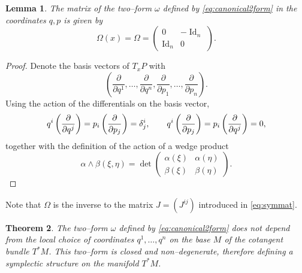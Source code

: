 \documentclass[english,fontsize=11pt,paper=a5,oneside]{scrbook}
\let\d\relax
\DeclareMathOperator{\d}{d}
\DeclareMathOperator{\Id}{Id}
\newtheorem{theorem}{Theorem}[chapter]
\newtheorem{lemma}[theorem]{Lemma}
\theoremstyle{definition}
\begin{document}
\begin{lemma}
    The matrix of the two--form $\omega$ defined by \eqref{eq:canonical2form} in the coordinates $q,p$ is given by
    \begin{equation}\label{eq:symmatpqcoords}
        \Omega(x) = \Omega = \begin{pmatrix}
            0 & -\Id_n \\
            \Id_n & 0
        \end{pmatrix}.
    \end{equation}
\end{lemma}
\begin{proof}
    Denote the basis vectors of $T_x P$ with
    \begin{equation}
        \left(
            \frac{\partial}{\partial q^1}, \ldots, \frac{\partial}{\partial q^n},
            \frac{\partial}{\partial p_1}, \ldots, \frac{\partial}{\partial p_n}
        \right).
    \end{equation}
    Using the action of the differentials on the basis vector,
    \begin{equation}
            \d q^i\left(\frac{\partial}{\partial q^j}\right) = \d p_i\left(\frac{\partial}{\partial p_j}\right) =\delta^i_j, \qquad
            \d q^i\left(\frac{\partial}{\partial p_j}\right) = 
            \d p_i\left(\frac{\partial}{\partial q^j}\right) = 0,
    \end{equation}
    together with the definition of the action of a wedge product
    \begin{equation}
        \alpha \wedge \beta (\xi, \eta) = \det\begin{pmatrix}
            \alpha(\xi) & \alpha(\eta) \\
            \beta(\xi) & \beta(\eta)
        \end{pmatrix}.
    \end{equation}
\end{proof}

Note that $\Omega$ is the inverse to the matrix $J = (J^{ij})$ introduced in \eqref{eq:symmat}.

\begin{theorem}\label{thm:propc2f}
    The two--form $\omega$ defined by \eqref{eq:canonical2form} does not depend from the local choice of coordinates $q^1, \ldots, q^n$ on the base $M$ of the cotangent bundle $T^* M$. This two--form is closed and non--degenerate, therefore defining a symplectic structure on the manifold $T^*M$.
\end{theorem}
\end{document}
